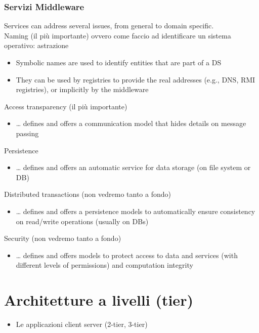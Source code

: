 \subsubsection{Servizi Middleware}
Services can address several issues, from general to domain specific.
\\Naming (il più importante) ovvero come faccio ad identificare un sistema operativo: astrazione
\begin{itemize}
    \item Symbolic names are used to identify entities that are part of a DS
    \item They can be used by registries to provide the real addresses (e.g., DNS, RMI registries), or implicitly by the middleware
\end{itemize}
Access transparency (il più importante)
\begin{itemize}
    \item … defines and offers a communication model that hides details on message passing
\end{itemize}
Persistence
\begin{itemize}
    \item … defines and offers an automatic service for data storage (on file system or DB)
\end{itemize}
Distributed transactions (non vedremo tanto a fondo)
\begin{itemize}
    \item … defines and offers a persistence models to automatically ensure consistency on read/write operations (usually on DBs)
\end{itemize}
Security (non vedremo tanto a fondo)
\begin{itemize}
    \item … defines and offers models to protect access to data and services (with different levels of permissions) and computation integrity
\end{itemize}


\section{Architetture a livelli (tier)}
\begin{itemize}
    \item Le applicazioni client server (2-tier, 3-tier)
\end{itemize}

